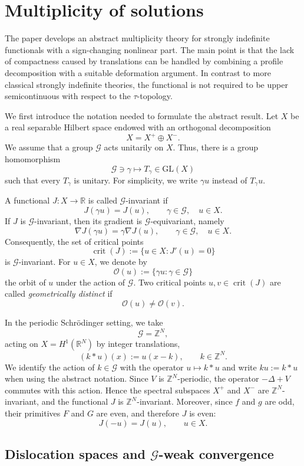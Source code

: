 \documentclass[11pt]{amsart}
\numberwithin{equation}{section}
\theoremstyle{definition}
\newcommand{\R}{\mathbb{R}}
\newcommand{\Z}{\mathbb{Z}}
\newcommand{\cG}{\mathcal{G}}
\newcommand{\crit}{\operatorname{crit}}
\begin{document}
\section{Multiplicity of solutions}

The paper \cite{BBS2025} develops an abstract multiplicity theory for
strongly indefinite functionals with a sign-changing nonlinear part. The
main point is that the lack of compactness caused by translations can be
handled by combining a profile decomposition with a suitable deformation
argument. In contrast to more classical strongly indefinite theories, the
functional is not required to be upper semicontinuous with respect to the
$\tau$-topology.

We first introduce the notation needed to formulate the abstract result.
Let $X$ be a real separable Hilbert space endowed with an orthogonal
decomposition
\[
X=X^+\oplus X^-.
\]
We assume that a group $\cG$ acts unitarily on $X$. Thus, there is a group
homomorphism
\[
\cG\ni \gamma\longmapsto T_\gamma\in \mathrm{GL}(X)
\]
such that every $T_\gamma$ is unitary. For simplicity, we write $\gamma u$ instead of
$T_\gamma u$.

A functional $J:X\to\R$ is called $\cG$-invariant if
\[
J(\gamma u)=J(u),
\qquad
\gamma\in\cG,\quad u\in X.
\]
If $J$ is $\cG$-invariant, then its gradient is $\cG$-equivariant, namely
\[
\nabla J(\gamma u)=\gamma\nabla J(u),
\qquad
\gamma\in\cG,\quad u\in X.
\]
Consequently, the set of critical points
\[
\crit(J):=\{u\in X:J'(u)=0\}
\]
is $\cG$-invariant. For $u\in X$, we denote by
\[
\mathcal{O}(u):=\{\gamma u:\gamma\in\cG\}
\]
the orbit of $u$ under the action of $\cG$. Two critical points $u,v\in
\crit(J)$ are called \emph{geometrically distinct} if
\[
\mathcal{O}(u)\neq \mathcal{O}(v).
\]

In the periodic Schr\"odinger setting, we take
\[
\cG=\Z^N,
\]
acting on $X=H^1(\R^N)$ by integer translations,
\[
(k*u)(x):=u(x-k),
\qquad
k\in\Z^N.
\]
We identify the action of $k\in\cG$ with the operator $u\mapsto k*u$ and
write $ku:=k*u$ when using the abstract notation.
Since $V$ is $\Z^N$-periodic, the operator $-\Delta+V$ commutes with this
action. Hence the spectral subspaces $X^+$ and $X^-$ are
$\Z^N$-invariant, and the functional $J$ is $\Z^N$-invariant. Moreover,
since $f$ and $g$ are odd, their primitives $F$ and $G$ are even, and
therefore $J$ is even:
\[
J(-u)=J(u),
\qquad
u\in X.
\]

\subsection{Dislocation spaces and \texorpdfstring{$\cG$}{G}-weak convergence}
\end{document}
